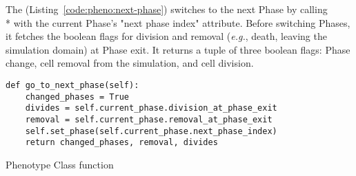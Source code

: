 
The  (Listing~\ref{code:pheno:next-phase}) switches to the next Phase by calling \\* with the current Phase's "next phase index" attribute. Before switching Phases, it fetches the boolean flags for division and removal (\textit{e.g.}, death, leaving the simulation domain) at Phase exit. It returns a tuple of three boolean flags: Phase change, cell removal from the simulation, and cell division.
\begin{listing}[H]
\begin{verbatim}
def go_to_next_phase(self):
    changed_phases = True
    divides = self.current_phase.division_at_phase_exit
    removal = self.current_phase.removal_at_phase_exit
    self.set_phase(self.current_phase.next_phase_index)
    return changed_phases, removal, divides
\end{verbatim}
\caption{Phenotype Class  function}\label{code:pheno:next-phase}
\end{listing}

